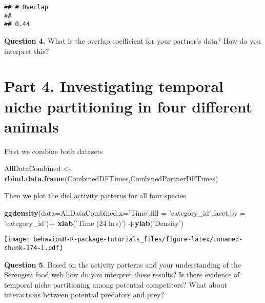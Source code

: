 \documentclass[]{book}
\newenvironment{Shaded}{\begin{snugshade}}{\end{snugshade}}
\newcommand{\DataTypeTok}[1]{\textcolor[rgb]{0.13,0.29,0.53}{#1}}
\newcommand{\KeywordTok}[1]{\textcolor[rgb]{0.13,0.29,0.53}{\textbf{#1}}}
\newcommand{\NormalTok}[1]{#1}
\newcommand{\OperatorTok}[1]{\textcolor[rgb]{0.81,0.36,0.00}{\textbf{#1}}}
\newcommand{\StringTok}[1]{\textcolor[rgb]{0.31,0.60,0.02}{#1}}
\begin{document}
\begin{verbatim}
## # Overlap
## 
## 0.44
\end{verbatim}

\textbf{Question 4.} What is the overlap coefficient for your partner's data? How do you interpret this?

\hypertarget{part-4.-investigating-temporal-niche-partitioning-in-four-different-animals}{%
\section*{Part 4. Investigating temporal niche partitioning in four different animals}\label{part-4.-investigating-temporal-niche-partitioning-in-four-different-animals}}

First we combine both datasets

\begin{Shaded}
\begin{Highlighting}[]
\NormalTok{AllDataCombined <-}\StringTok{ }\KeywordTok{rbind.data.frame}\NormalTok{(CombinedDFTimes,CombinedPartnerDFTimes)}
\end{Highlighting}
\end{Shaded}

Then we plot the diel activity patterns for all four species

\begin{Shaded}
\begin{Highlighting}[]
\KeywordTok{ggdensity}\NormalTok{(}\DataTypeTok{data=}\NormalTok{AllDataCombined,}\DataTypeTok{x=}\StringTok{'Time'}\NormalTok{,}\DataTypeTok{fill =} \StringTok{'category_id'}\NormalTok{,}\DataTypeTok{facet.by =} \StringTok{'category_id'}\NormalTok{)}\OperatorTok{+}
\StringTok{  }\KeywordTok{xlab}\NormalTok{(}\StringTok{'Time (24 hrs)'}\NormalTok{) }\OperatorTok{+}\KeywordTok{ylab}\NormalTok{(}\StringTok{'Density'}\NormalTok{)}
\end{Highlighting}
\end{Shaded}

\texttt{[image: behaviouR-R-package-tutorials\_files/figure-latex/unnamed-chunk-174-1.pdf]}

\textbf{Question 5}. Based on the activity patterns and your understanding of the Serengeti food web how do you interpret these results? Is there evidence of temporal niche partitioning among potential competitors? What about interactions between potential predators and prey?
\end{document}
